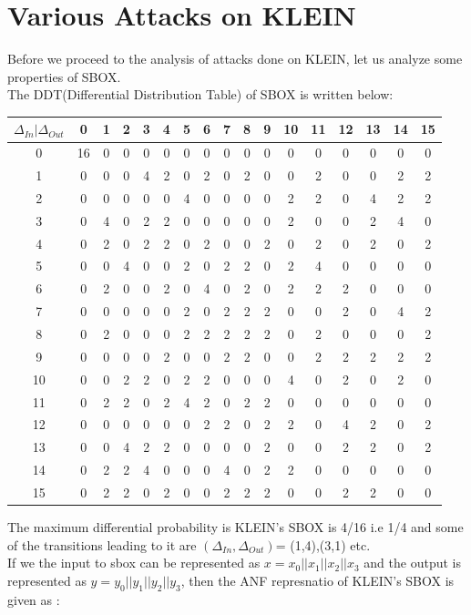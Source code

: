 \documentclass[preprint]{transcrypto}
\begin{document}
\section{Various Attacks on KLEIN}
Before we proceed to the analysis of attacks done on KLEIN, let us analyze some properties of SBOX.\\
The DDT(Differential Distribution Table) of SBOX is written below:
\begin{center}
    

\begin{tabular}{|c|c|c|c|c|c|c|c|c|c|c|c|c|c|c|c|c|}
\hline
$\Delta_{In}|\Delta_{Out}$ &0&1&2&3&4&5&6&7&8&9&10&11&12&13&14&15 \\
\hline
0&16& 0& 0& 0& 0& 0& 0& 0& 0& 0& 0& 0& 0& 0& 0& 0 \\
\hline
1&0& 0& 0& 4& 2& 0& 2& 0& 2& 0& 0& 2& 0& 0& 2& 2 \\
\hline
2&0& 0& 0& 0& 0& 4& 0& 0& 0& 0& 2& 2& 0& 4& 2& 2 \\
\hline
3&0& 4& 0& 2& 2& 0& 0& 0& 0& 0& 2& 0& 0& 2& 4& 0 \\
\hline
4&0& 2& 0& 2& 2& 0& 2& 0& 0& 2& 0& 2& 0& 2& 0& 2 \\
\hline
5&0& 0& 4& 0& 0& 2& 0& 2& 2& 0& 2& 4& 0& 0& 0& 0 \\
\hline
6&0& 2& 0& 0& 2& 0& 4& 0& 2& 0& 2& 2& 2& 0& 0& 0 \\
\hline
7&0& 0& 0& 0& 0& 2& 0& 2& 2& 2& 0& 0& 2& 0& 4& 2 \\
\hline
8&0& 2& 0& 0& 0& 2& 2& 2& 2& 2& 0& 2& 0& 0& 0& 2 \\
\hline
9&0& 0& 0& 0& 2& 0& 0& 2& 2& 0& 0& 2& 2& 2& 2& 2 \\
\hline
10&0& 0& 2& 2& 0& 2& 2& 0& 0& 0& 4& 0& 2& 0& 2& 0 \\
\hline
11&0& 2& 2& 0& 2& 4& 2& 0& 2& 2& 0& 0& 0& 0& 0& 0 \\
\hline
12&0& 0& 0& 0& 0& 0& 2& 2& 0& 2& 2& 0& 4& 2& 0& 2 \\
\hline
13&0& 0& 4& 2& 2& 0& 0& 0& 0& 2& 0& 0& 2& 2& 0& 2 \\
\hline
14&0& 2& 2& 4& 0& 0& 0& 4& 0& 2& 2& 0& 0& 0& 0& 0 \\
\hline
15&0& 2& 2& 0& 2& 0& 0& 2& 2& 2& 0& 0& 2& 2& 0& 0 \\
\hline
\end{tabular}
\end{center}
The maximum differential probability is KLEIN's SBOX is 4/16 i.e 1/4 and some of the transitions leading to it are $(\Delta_{In},\Delta_{Out})$= (1,4),(3,1) etc.\\
If we the input to sbox can be represented as $x=x_{0}||x_{1}||x_{2}||x_{3}$ and the output is represented as $y = y_{0}||y_{1}||y_{2}||y_{3}$, then the ANF represnatio of KLEIN's SBOX is given as :\\
\end{document}

